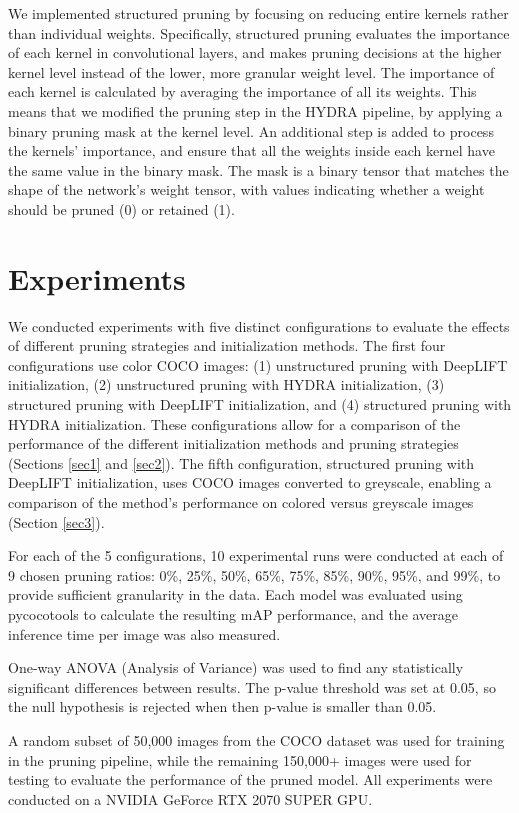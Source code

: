 \documentclass[10pt]{cai}
\begin{document}
We implemented structured pruning by focusing on reducing entire kernels rather than individual weights. Specifically, structured pruning evaluates the importance of each kernel in convolutional layers, and makes pruning decisions at the higher kernel level instead of the lower, more granular weight level. The importance of each kernel is calculated by averaging the importance of all its weights. This means that we  modified the pruning step in the HYDRA pipeline, by applying a binary pruning mask at the kernel level. An additional step is added to process the kernels' importance, and ensure that all the weights inside each kernel have the same value in the binary mask. The mask is a binary tensor that matches the shape of the network's weight tensor, with values indicating whether a weight should be pruned (0) or retained (1).

\section{Experiments}
We conducted experiments with five distinct configurations to evaluate the effects of different pruning strategies and initialization methods. The first four configurations use color COCO images: (1) unstructured pruning with DeepLIFT initialization, (2) unstructured pruning with HYDRA initialization, (3) structured pruning with DeepLIFT initialization, and (4) structured pruning with HYDRA initialization. These configurations allow for a comparison of the performance of the different initialization methods and pruning strategies (Sections \ref{sec1} and \ref{sec2}). The fifth configuration, structured pruning with DeepLIFT initialization, uses COCO images converted to greyscale, enabling a comparison of the method's performance on colored versus greyscale images (Section \ref{sec3}).

For each of the 5 configurations, 10 experimental runs were conducted at each of 9 chosen pruning ratios: 0\%, 25\%, 50\%, 65\%, 75\%, 85\%, 90\%, 95\%, and 99\%, to provide sufficient granularity in the data. Each model was evaluated using pycocotools to calculate the resulting mAP performance, and the average inference time per image was also measured. 

One-way ANOVA (Analysis of Variance) was used to find any statistically significant differences between results. The p-value threshold was set at 0.05, so the null hypothesis is rejected when then p-value is smaller than 0.05. 

A random subset of 50,000 images from the COCO dataset was used for training in the pruning pipeline, while the remaining 150,000+ images were used for testing to evaluate the performance of the pruned model. All experiments were conducted on a NVIDIA GeForce RTX 2070 SUPER GPU.
\end{document}
